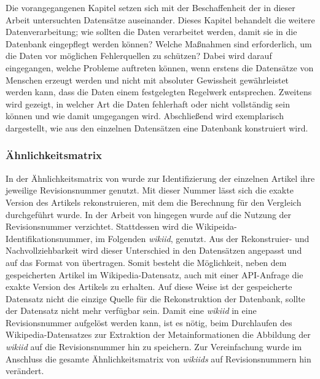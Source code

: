 Die vorangegangenen Kapitel setzen sich mit der Beschaffenheit der in dieser Arbeit untersuchten Datensätze auseinander. Dieses Kapitel behandelt die weitere Datenverarbeitung; wie sollten die Daten verarbeitet werden, damit sie in die Datenbank eingepflegt werden können? Welche Maßnahmen sind erforderlich, um die Daten vor möglichen Fehlerquellen zu schützen?
Dabei wird darauf eingegangen, welche Probleme auftreten können, wenn erstens die Datensätze von Menschen erzeugt werden und nicht mit absoluter Gewissheit gewährleistet werden kann, dass die Daten einem festgelegten Regelwerk entsprechen. Zweitens wird gezeigt, in welcher Art die Daten fehlerhaft oder nicht vollständig sein können und wie damit umgegangen wird.
Abschließend wird exemplarisch dargestellt, wie aus den einzelnen Datensätzen eine Datenbank konstruiert wird.

\subsubsection*{Ähnlichkeitsmatrix}
In der Ähnlichkeitsmatrix von \cite{riehmann2016visualizing} wurde zur Identifizierung der einzelnen Artikel ihre jeweilige Revisionsnummer genutzt.
Mit dieser Nummer lässt sich die exakte Version des Artikels rekonstruieren, mit dem die Berechnung für den Vergleich durchgeführt wurde.
In der Arbeit von \cite{licht:2017} hingegen wurde auf die Nutzung der Revisionsnummer verzichtet. Stattdessen wird die Wikipeida-Identifikationsnummer, im Folgenden \emph{wikiid}, genutzt.
Aus der Rekonstruier- und Nachvollziehbarkeit wird dieser Unterschied in den Datensätzen angepasst und auf das Format von \cite{riehmann2016visualizing} übertragen. Somit besteht die Möglichkeit, neben dem gespeicherten Artikel im Wikipedia-Datensatz, auch mit einer API-Anfrage die exakte Version des Artikels zu erhalten.
Auf diese Weise ist der gespeicherte Datensatz nicht die einzige Quelle für die Rekonstruktion der Datenbank, sollte der Datensatz nicht mehr verfügbar sein.
Damit eine \emph{wikiid} in eine Revisionsnummer aufgelöst werden kann, ist es nötig, beim Durchlaufen des Wikipedia-Datensatzes zur Extraktion der Metainformationen die Abbildung der \emph{wikiid} auf die Revisionsnummer hin zu speichern.
Zur Vereinfachung wurde im Anschluss die gesamte Ähnlichkeitsmatrix von \emph{wikiids} auf Revisionsnummern hin verändert.

